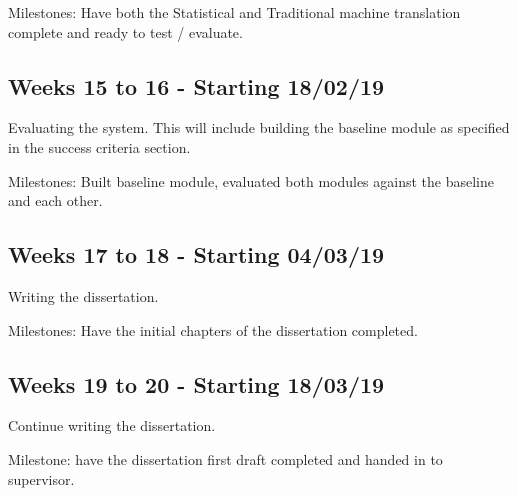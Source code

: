 \documentclass[12pt]{article}
\begin{document}
Milestones: Have both the Statistical and Traditional machine translation complete and ready to test / evaluate.

\subsection*{Weeks 15 to 16 - Starting 18/02/19}

Evaluating the system. This will include building the baseline module as specified in the success criteria section.

Milestones: Built baseline module, evaluated both modules against the baseline and each other.

\subsection*{Weeks 17 to 18 - Starting 04/03/19}

Writing the dissertation.

Milestones: Have the initial chapters of the dissertation completed.

\subsection*{Weeks 19 to 20 - Starting 18/03/19}

Continue writing the dissertation.

Milestone: have the dissertation first draft completed and handed in to supervisor.
\end{document}
